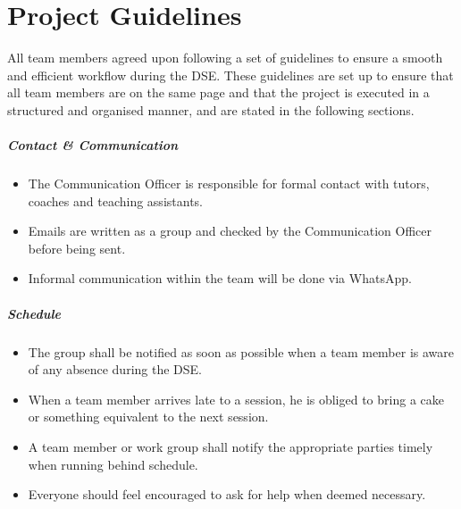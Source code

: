 \chapter{Project Guidelines}\label{ch:project_rules}
All team members agreed upon following a set of guidelines to ensure a smooth and efficient workflow during the DSE.
These guidelines are set up to ensure that all team members are on the same page and that the project is executed in a structured and organised manner, and are stated in the following sections.

\paragraph{Contact \& Communication}
\begin{itemize}
    \item The Communication Officer is responsible for formal contact with tutors, coaches and teaching assistants.
    \item Emails are written as a group and checked by the Communication Officer before being sent.
    \item Informal communication within the team will be done via WhatsApp.
\end{itemize}

\paragraph{Schedule}
\begin{itemize}
    \item The group shall be notified as soon as possible when a team member is aware of any absence during the DSE.
    \item When a team member arrives late to a session, he is obliged to bring a cake or something equivalent to the next session.
    \item A team member or work group shall notify the appropriate parties timely when running behind schedule.
    \item Everyone should feel encouraged to ask for help when deemed necessary.
\end{itemize}

